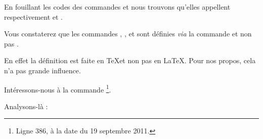 En fouillant les codes des commandes  et  nous trouvons qu'elles appellent respectivement  et .

\begin{plusloins}
Vous constaterez que les commandes , ,  et  sont définies \emph{via} la commande  et non pas . 

En effet la définition est faite en \TeX et non pas en \LaTeX. Pour nos propos, cela n'a pas grande influence.
\end{plusloins} 

Intéressons-nous à la commande \footnote{Ligne 386, à la date du 19 septembre 2011.}.

\begin{latexcode}
\def\@makechapterhead#1{%
  \vspace*{50\p@}%
  {\parindent \z@ \raggedright \normalfont
    \ifnum \c@secnumdepth >\m@ne
      \if@mainmatter
        \huge\bfseries \@chapapp\space \thechapter
        \par\nobreak
        \vskip 20\p@
      \fi
    \fi
    \interlinepenalty\@M
    \Huge \bfseries #1\par\nobreak
    \vskip 40\p@
  }}
\end{latexcode}

Analysons-là :

